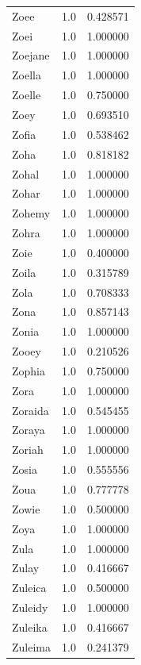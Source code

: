 \documentclass[
  letterpaper,
  DIV=11,
  numbers=noendperiod]{scrreprt}
\begin{document}
\begin{tabular}{lrr}
Zoee            &   1.0 &   0.428571 \\
Zoei            &   1.0 &   1.000000 \\
Zoejane         &   1.0 &   1.000000 \\
Zoella          &   1.0 &   1.000000 \\
Zoelle          &   1.0 &   0.750000 \\
Zoey            &   1.0 &   0.693510 \\
Zofia           &   1.0 &   0.538462 \\
Zoha            &   1.0 &   0.818182 \\
Zohal           &   1.0 &   1.000000 \\
Zohar           &   1.0 &   1.000000 \\
Zohemy          &   1.0 &   1.000000 \\
Zohra           &   1.0 &   1.000000 \\
Zoie            &   1.0 &   0.400000 \\
Zoila           &   1.0 &   0.315789 \\
Zola            &   1.0 &   0.708333 \\
Zona            &   1.0 &   0.857143 \\
Zonia           &   1.0 &   1.000000 \\
Zooey           &   1.0 &   0.210526 \\
Zophia          &   1.0 &   0.750000 \\
Zora            &   1.0 &   1.000000 \\
Zoraida         &   1.0 &   0.545455 \\
Zoraya          &   1.0 &   1.000000 \\
Zoriah          &   1.0 &   1.000000 \\
Zosia           &   1.0 &   0.555556 \\
Zoua            &   1.0 &   0.777778 \\
Zowie           &   1.0 &   0.500000 \\
Zoya            &   1.0 &   1.000000 \\
Zula            &   1.0 &   1.000000 \\
Zulay           &   1.0 &   0.416667 \\
Zuleica         &   1.0 &   0.500000 \\
Zuleidy         &   1.0 &   1.000000 \\
Zuleika         &   1.0 &   0.416667 \\
Zuleima         &   1.0 &   0.241379 \\

\end{tabular}
\end{document}
